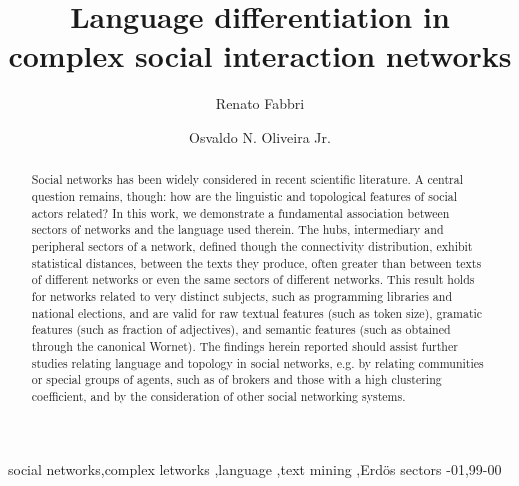 \documentclass[review]{elsarticle}
\begin{document}
\begin{frontmatter}

\title{Language differentiation in complex social interaction networks}

\author[mainaddr]{Renato Fabbri}

\author[secaddr]{Osvaldo N. Oliveira Jr.}

\address[mainaddr]{Institute of Mathematics and Computer Sciences (ICMC/USP) - Avenida Trabalhador São-carlense, 400 - Centro, São Carlos, SP, Brazil}
  \address[secaddr]{São Carlos Institute of Physics (IFSC/USP) - Avenida Trabalhador São-carlense, 400 - Centro, São Carlos, 13566-590, SP, Brazil}

\begin{abstract}
  Social networks has been widely considered in recent scientific literature.
  A central question remains, though: how are the linguistic and topological features of
  social actors related?
  In this work, we demonstrate a fundamental association between sectors of networks
  and the language used therein.
  The hubs, intermediary and peripheral sectors of a network, defined though the
  connectivity distribution, exhibit statistical distances, between the texts they produce,
  often greater than between texts of different networks or even the same sectors of different networks.
  This result holds for networks related to very distinct subjects, such as programming libraries and
  national elections, and are valid for raw textual features (such as token size),
  gramatic features (such as fraction of adjectives), and semantic features
  (such as obtained through the canonical Wornet).
  The findings herein reported should assist further studies relating language and topology
  in social networks, e.g. by relating communities or special groups of agents, such as of brokers
   and those with a high clustering coefficient, and by the consideration of other social networking systems.
\end{abstract}

\begin{keyword}
social networks\sep complex letworks \sep language \sep text mining \sep Erdös sectors
-01\sep  99-00
\end{keyword}

\end{frontmatter}
\end{document}
